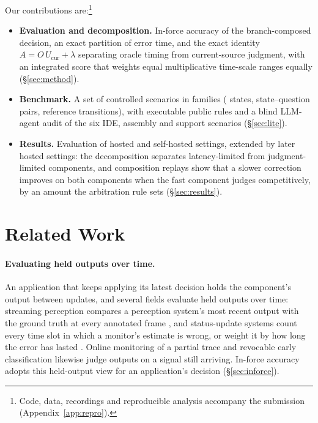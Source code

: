 \documentclass[11pt]{article}
\begin{document}
Our contributions are:\footnote{Code, data, recordings and reproducible analysis accompany the submission (Appendix~\ref{app:repro}).}
\begin{itemize}[leftmargin=*,itemsep=1pt,topsep=2pt]
\item \textbf{Evaluation and decomposition.} In-force accuracy of the branch-composed decision, an exact partition of error time, and the exact identity $A=O\,U_{\mathrm{cur}}+\lambda$ separating oracle timing from current-source judgment, with an integrated score that weights equal multiplicative time-scale ranges equally (\S\ref{sec:method}).
\item \textbf{Benchmark.} A set of \NumScenariosWord{} controlled scenarios in \NumFamiliesWord{} families (\NumStates{} states, \AnswersPerPass{} state--question pairs, \TransitionsTotal{} reference transitions), with executable public rules and a blind LLM-agent audit of the six IDE, assembly and support scenarios (\S\ref{sec:lite}).
\item \textbf{Results.} Evaluation of \OwTotalSettingsWord{} hosted and self-hosted settings, extended by later hosted settings: the decomposition separates latency-limited from judgment-limited components, and composition replays show that a slower correction improves on both components when the fast component judges competitively, by an amount the arbitration rule sets (\S\ref{sec:results}).
\end{itemize}

\section{Related Work}
\label{sec:related}

\paragraph{Evaluating held outputs over time.}
An application that keeps applying its latest decision holds the component's output between updates, and several fields evaluate held outputs over time: streaming perception compares a perception system's most recent output with the ground truth at every annotated frame \citep{li2020towards}, and status-update systems count every time slot in which a monitor's estimate is wrong, or weight it by how long the error has lasted \citep{maatouk2020age,maatouk2023age}.
Online monitoring of a partial trace \citep{deshmukh2015robust} and revocable early classification \citep{achenchabe2021early} likewise judge outputs on a signal still arriving.
In-force accuracy adopts this held-output view for an application's decision (\S\ref{sec:inforce}).
\end{document}
